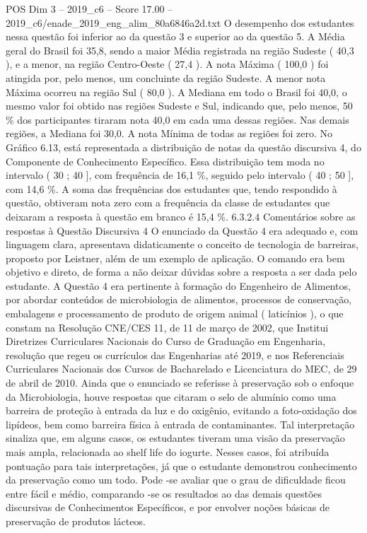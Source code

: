 \begin{textsample}{POS Dim 3 – 2019\_c6 – Score 17.00 – 2019\_c6/enade\_2019\_eng\_alim\_80a6846a2d.txt}
O desempenho dos estudantes nessa questão foi inferior ao da questão 3 e superior ao da questão 5.
A Média geral do Brasil foi 35,8, sendo a maior Média registrada na região Sudeste ( 40,3 ), e a menor, na região Centro-Oeste ( 27,4 ).
A nota Máxima ( 100,0 ) foi atingida por, pelo menos, um concluinte da região Sudeste.
A menor nota Máxima ocorreu na região Sul ( 80,0 ).
A Mediana em todo o Brasil foi 40,0, o mesmo valor foi obtido nas regiões Sudeste e Sul, indicando que, pelo menos, 50 \% dos participantes tiraram nota 40,0 em cada uma dessas regiões.
Nas demais regiões, a Mediana foi 30,0.
A nota Mínima de todas as regiões foi zero.
No Gráfico 6.13, está representada a distribuição de notas da questão discursiva 4, do Componente de Conhecimento Específico.
Essa distribuição tem moda no intervalo ( 30 ; 40 ], com frequência de 16,1 \%, seguido pelo intervalo ( 40 ; 50 ], com 14,6 \%.
A soma das frequências dos estudantes que, tendo respondido à questão, obtiveram nota zero com a frequência da classe de estudantes que deixaram a resposta à questão em branco é 15,4 \%. 6.3.2.4 Comentários sobre as respostas à Questão Discursiva 4 O enunciado da Questão 4 era adequado e, com linguagem clara, apresentava didaticamente o conceito de tecnologia de barreiras, proposto por Leistner, além de um exemplo de aplicação.
O comando era bem objetivo e direto, de forma a não deixar dúvidas sobre a resposta a ser dada pelo estudante.
A Questão 4 era pertinente à formação do Engenheiro de Alimentos, por abordar conteúdos de microbiologia de alimentos, processos de conservação, embalagens e processamento de produto de origem animal ( laticínios ), o que constam na Resolução CNE/CES 11, de 11 de março de 2002, que Institui Diretrizes Curriculares Nacionais do Curso de Graduação em Engenharia, resolução que regeu os currículos das Engenharias até 2019, e nos Referenciais Curriculares Nacionais dos Cursos de Bacharelado e Licenciatura do MEC, de 29 de abril de 2010.
Ainda que o enunciado se referisse à preservação sob o enfoque da Microbiologia, houve respostas que citaram o selo de alumínio como uma barreira de proteção à entrada da luz e do oxigênio, evitando a foto-oxidação dos lipídeos, bem como barreira física à entrada de contaminantes.
Tal interpretação sinaliza que, em alguns casos, os estudantes tiveram uma visão da preservação mais ampla, relacionada ao shelf life do iogurte.
Nesses casos, foi atribuída pontuação para tais interpretações, já que o estudante demonstrou conhecimento da preservação como um todo.
Pode -se avaliar que o grau de dificuldade ficou entre fácil e médio, comparando -se os resultados ao das demais questões discursivas de Conhecimentos Específicos, e por envolver noções básicas de preservação de produtos lácteos.

\end{textsample}
